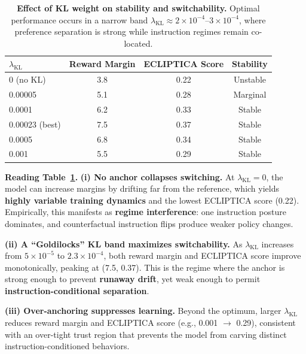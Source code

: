 \begin{table}[ht!]
\centering
\small
\renewcommand{\arraystretch}{1.2}
\begin{tabular}{@{}lccc@{}}
\toprule
\textbf{$\lambda_{\text{KL}}$} & \textbf{Reward Margin} & \textbf{ECLIPTICA Score} & \textbf{Stability} \\
\midrule
0 (no KL) & 3.8 & 0.22 & Unstable \\ \hline
0.00005 & 5.1 & 0.28 & Marginal \\ \hline
0.0001 & 6.2 & 0.33 & Stable \\ \hline
0.00023 (best) & 7.5 & 0.37 & Stable \\ \hline
0.0005 & 6.8 & 0.34 & Stable \\ \hline
0.001 & 5.5 & 0.29 & Stable \\
\bottomrule
\end{tabular}
\caption{\textbf{Effect of KL weight on stability and switchability.} Optimal performance occurs in a narrow band $\lambda_{\text{KL}}\approx 2\times 10^{-4}$--$3\times 10^{-4}$, where preference separation is strong while instruction regimes remain co-located.}
\label{tab:kl_ablation}
\end{table}

\vspace{-0.35em}
\noindent\textbf{Reading Table~\ref{tab:kl_ablation}.}
\textbf{(i) No anchor collapses switching.}
At $\lambda_{\text{KL}}=0$, the model can increase margins by drifting far from the reference, which yields \textbf{highly variable training dynamics} and the lowest ECLIPTICA score (0.22).
Empirically, this manifests as \textbf{regime interference}: one instruction posture dominates, and counterfactual instruction flips produce weaker policy changes.

\vspace{-0.25em}
\noindent
\textbf{(ii) A ``Goldilocks'' KL band maximizes switchability.}
As $\lambda_{\text{KL}}$ increases from $5\times 10^{-5}$ to $2.3\times 10^{-4}$, both reward margin and ECLIPTICA score improve monotonically, peaking at (7.5, 0.37).
This is the regime where the anchor is strong enough to prevent \textbf{runaway drift}, yet weak enough to permit \textbf{instruction-conditional separation}.

\vspace{-0.25em}
\noindent
\textbf{(iii) Over-anchoring suppresses learning.}
Beyond the optimum, larger $\lambda_{\text{KL}}$ reduces reward margin and ECLIPTICA score (e.g., 0.001 $\rightarrow$ 0.29), consistent with an over-tight trust region that prevents the model from carving distinct instruction-conditioned behaviors.

